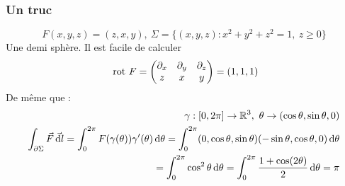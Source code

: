 \documentclass[12pt,a4paper]{article}
\begin{document}
\subsubsection{Un truc}
\[F(x,y,z) = (z,x,y),\ \Sigma = \{(x,y,z) : x^2 + y^2 + z^2 = 1,\ z \geq 0\}\]
Une demi sphère. Il est facile de calculer 
\[\text{ rot } F = \begin{pmatrix}
	\partial_x & \partial_y & \partial_z\\
	z & x & y
\end{pmatrix} = (1,1,1)\]
De même que :
\begin{align*}
	\gamma : [0,2\pi] \to \mathbb{R}^3,\ \theta \to (\cos\theta,\sin\theta,0)\\
	\int_{\partial \Sigma} \vec{F} \vec{\, \mathrm d l} = \int_0^{2\pi} F(\gamma(\theta)) \gamma'(\theta) \, \mathrm d \theta = \int_0^{2\pi} (0, \cos\theta, \sin\theta)(-\sin\theta, \cos\theta, 0) \, \mathrm d \theta\\
	= \int_0^{2\pi} \cos^2\theta \, \mathrm d \theta = \int_0^{2\pi} \frac{1+\cos(2\theta)}{2} \, \mathrm d \theta = \pi
\end{align*}
\end{document}
